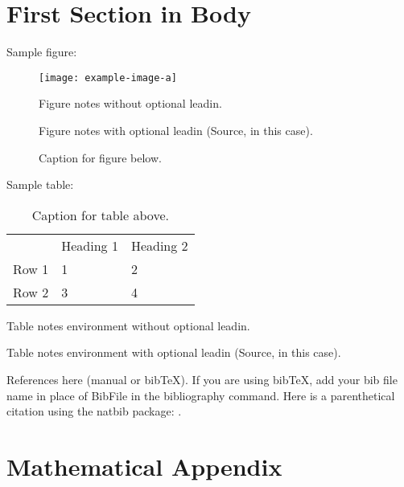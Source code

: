 \documentclass[PP,
finalmode,  %
]{AEA}
\begin{document}
\section{First Section in Body}

Sample figure:

\begin{figure}
    \texttt{[image: example-image-a]}
    
    \caption{Caption for figure below.}
    \begin{figurenotes}
        Figure notes without optional leadin.
    \end{figurenotes}
    \begin{figurenotes}[Source]
        Figure notes with optional leadin (Source, in this case).
    \end{figurenotes}
\end{figure}

Sample table:

\begin{table}
    \caption{Caption for table above.}
    
    \begin{tabular}{lll}
              & Heading 1 & Heading 2 \\ 
        Row 1 & 1         & 2         \\ 
        Row 2 & 3         & 4         %
    \end{tabular}
    \begin{tablenotes}
        Table notes environment without optional leadin.
    \end{tablenotes}
    \begin{tablenotes}[Source]
        Table notes environment with optional leadin (Source, in this case).
    \end{tablenotes}
\end{table}

References here (manual or bibTeX). If you are using bibTeX, add your bib file 
name in place of BibFile in the bibliography command. Here is a parenthetical citation using the natbib package: \citep{Lehe2024}.





\appendix

\section{Mathematical Appendix}
\end{document}
